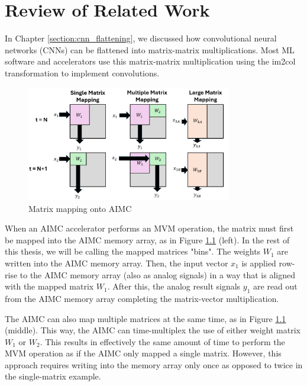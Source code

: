 \chapter{Review of Related Work}

\label{chapter:mapping}

In Chapter \ref{section:cnn_flattening}, we discussed how convolutional neural networks (CNNs) can be flattened into matrix-matrix multiplications. Most ML software and accelerators use this matrix-matrix multiplication using the im2col transformation to implement convolutions.

\begin{figure}[htbp]
    \centering
    \includegraphics[width=0.8\textwidth]{images/mapping/mapping_single.png}
    \caption{Matrix mapping onto AIMC}
    \label{fig:mapping_single}
\end{figure}

When an AIMC accelerator performs an MVM operation, the matrix must first be mapped into the AIMC memory array, as in Figure \ref{fig:mapping_single} (left). In the rest of this thesis, we will be calling the mapped matrices "bins". The weights $W_1$ are written into the AIMC memory array. Then, the input vector $x_1$ is applied row-rise to the AIMC memory array (also as analog signals) in a way that is aligned with the mapped matrix $W_1$. After this, the analog result signals $y_1$ are read out from the AIMC memory array completing the matrix-vector multiplication.

The AIMC can also map multiple matrices at the same time, as in Figure \ref{fig:mapping_single} (middle). This way, the AIMC can time-multiplex the use of either weight matrix $W_1$ or $W_2$. This results in effectively the same amount of time to perform the MVM operation as if the AIMC only mapped a single matrix. However, this approach requires writing into the memory array only once as opposed to twice in the single-matrix example.

